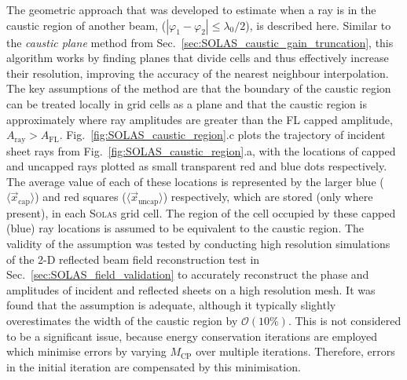 The geometric approach that was developed to estimate when a ray is in the caustic region of another beam, ($|\varphi_1-\varphi_2|\leq\lambda_0/2$), is described here.
Similar to the \textit{caustic plane} method from Sec.~\ref{sec:SOLAS_caustic_gain_truncation}, this algorithm works by finding planes that divide cells and thus effectively increase their resolution, improving the accuracy of the nearest neighbour interpolation.
The key assumptions of the method are that the boundary of the caustic region can be treated locally in grid cells as a plane and that the caustic region is approximately where ray amplitudes are greater than the \ac{FL} capped amplitude, $A_{\text{ray}}>A_{\text{FL}}$.
Fig.~\ref{fig:SOLAS_caustic_region}.c plots the trajectory of incident sheet rays from Fig.~\ref{fig:SOLAS_caustic_region}.a, with the locations of capped and uncapped rays plotted as small transparent red and blue dots respectively.
The average value of each of these locations is represented by the larger blue ($\langle\vec{x}_{\text{cap}}\rangle$) and red squares ($\langle\vec{x}_{\text{uncap}}\rangle$) respectively, which are stored (only where present), in each \textsc{Solas} grid cell.
The region of the cell occupied by these capped (blue) ray locations is assumed to be equivalent to the caustic region.
The validity of the assumption was tested by conducting high resolution simulations of the 2-D reflected beam field reconstruction test in Sec.~\ref{sec:SOLAS_field_validation} to accurately reconstruct the phase and amplitudes of incident and reflected sheets on a high resolution mesh.
It was found that the assumption is adequate, although it typically slightly overestimates the width of the caustic region by $\mathcal{O}(10 \%)$.
This is not considered to be a significant issue, because energy conservation iterations are employed which minimise errors by varying $M_{\text{CP}}$ over multiple iterations.
Therefore, errors in the initial iteration are compensated by this minimisation.

